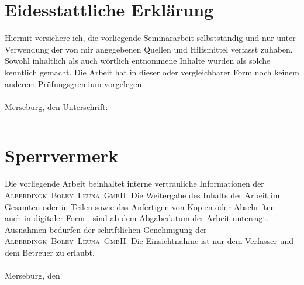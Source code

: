 \section*{Eidesstattliche Erklärung}
Hiermit versichere ich, die vorliegende Seminararbeit selbstständig und nur unter Verwendung der von mir angegebenen Quellen und Hilfsmittel verfasst zuhaben. Sowohl inhaltlich als auch wörtlich entnommene Inhalte wurden als solche kenntlich gemacht. Die Arbeit hat in dieser oder vergleichbarer Form noch keinem anderem Prüfungsgremium vorgelegen.\\ \\

Merseburg, den \todayDE \hfill Unterschrift:\rule{6cm}{0,3mm}

\vfill

\section*{Sperrvermerk}
Die vorliegende Arbeit beinhaltet interne vertrauliche Informationen der \linebreak \textsc{\mbox{Alberdingk Boley Leuna GmbH}}. Die Weitergabe des Inhalts der Arbeit im Gesamten oder in Teilen sowie das Anfertigen von Kopien oder Abschriften – auch in digitaler Form -  sind ab dem Abgabedatum der Arbeit untersagt. Ausnahmen bedürfen der schriftlichen Genehmigung der \textsc{\mbox{Alberdingk Boley Leuna GmbH}}. Die Einsichtnahme ist nur dem Verfasser und dem Betreuer zu erlaubt. \\ \\

Merseburg, den \todayDE 

\vfill